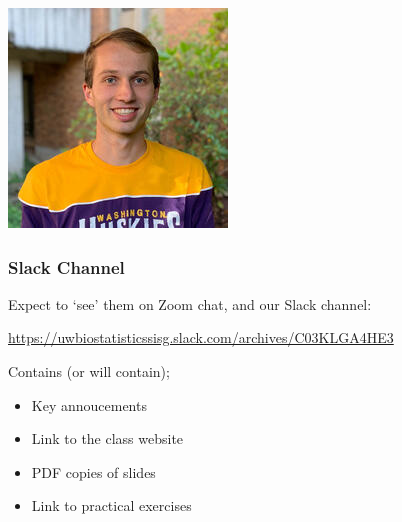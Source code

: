 \documentclass{beamer}
\begin{document}
\begin{frame}
\begin{center}
\begin{minipage}{0.32\linewidth}
	\end{minipage}
	\hfill
	\begin{minipage}{0.32\linewidth}
		\includegraphics[width=\linewidth,height=\linewidth]{Figures/seth-temple.jpeg}
	\end{minipage}
\end{center}

\end{frame}



\begin{frame}[fragile]
\frametitle{\bf Slack Channel}

Expect to `see' them on Zoom chat, and our Slack channel:
{\color{red}
 
\url{https://uwbiostatisticssisg.slack.com/archives/C03KLGA4HE3}


}
\vspace{.3cm}
Contains (or will contain);
\begin{itemize}
\item Key annoucements
\item Link to the class website
\item PDF copies of slides
\item Link to practical exercises
\end{itemize}
\end{frame}
\end{document}
